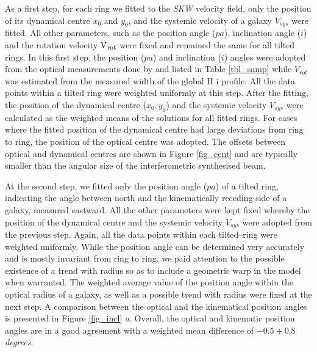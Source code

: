 \documentclass[usenatbib,useAMS]{mnras}
\begin{document}
As a first step, for each ring we fitted to the {\it SKW} velocity
field, only the position of its dynamical centre $x_{0}$ and $y_{0}$,
and the systemic velocity of a galaxy $V_{sys}$ were fitted.  All other
parameters, such as the position angle ($pa$), inclination angle ($i$)
and the rotation velocity V$_{\rm rot}$ were fixed and remained the same
for all tilted rings. In this first step, the position ($pa$) and
inclination ($i$) angles were adopted from the optical measurements
  done by  and listed in Table \ref{tbl_samp} while
  $V_{rot}$ was estimated from the measured width of the global H{\sc
    i} profile. All the data points within a tilted ring were weighted
uniformly at this step.  After the fitting, the position of the
dynamical centre ($x_{0},y_{0}$) and the systemic velocity $V_{sys}$
were calculated as the weighted means of the solutions for all fitted
rings.  For cases where the fitted position of the dynamical centre had
large deviations from ring to ring, the position of the optical centre
was adopted.  The offsets between optical and dynamical centres are
shown in Figure \ref{fig_cent} and are typically smaller than the
angular size of the interferometric synthesised beam. 

At the second step, we fitted only the position angle ($pa$) of a tilted
ring, indicating the angle between north and the kinematically receding
side of a galaxy, measured eastward.  All the other parameters were kept
fixed whereby the position of the dynamical centre and the systemic
velocity $V_{sys}$ were adopted from the previous step.  Again, all the
data points within each tilted--ring were weighted uniformly.  While the
position angle can be determined very accurately and is mostly invariant
from ring to ring, we paid attention to the possible existence of a
trend with radius so as to include a geometric warp in the model when
warranted.  The weighted average value of the position angle within the
optical radius of a galaxy, as well as a possible trend with radius were
fixed at the next step.  A comparison between the optical and the
kinematical position angles is presented in Figure \ref{fig_incl}{\it
a}.  Overall, the optical and kinematic position angles are in a good
agreement with a weighted mean difference of $-0.5\pm0.8$ {\it degrees}. 
\end{document}
